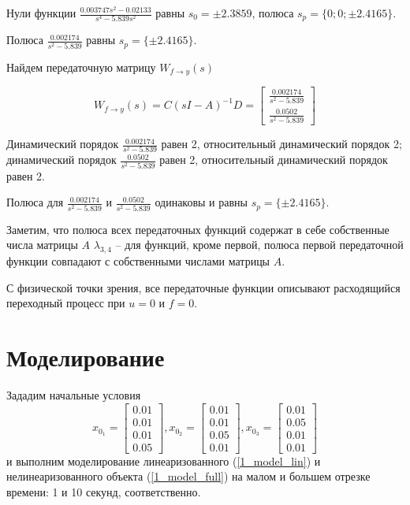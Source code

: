 Нули функции $\frac{0.003747s^2 -0.02133}{s^4-5.839s^2}$ равны $s_0 =\pm 2.3859$, полюса $s_p = \{ 0; 0; \pm 2.4165 \}$.

Полюса $\frac{0.002174}{s^2-5.839}$ равны $s_p = \{ \pm 2.4165 \}$.

Найдем передаточную матрицу $W_{f \to y}(s)$

\begin{equation}
    W_{f \to y} (s) = C \left(sI-A  \right)^{-1}D = \begin{bmatrix}
        \frac{0.002174}{s^2-5.839}\\[2ex]
        \frac{0.0502}{s^2-5.839}
    \end{bmatrix}
\end{equation}

Динамический порядок $ \frac{0.002174}{s^2-5.839}$ равен 2, относительный динамический порядок 2; динамический порядок $\frac{0.0502}{s^2-5.839}$ равен 2, относительный динамический порядок равен 2.

Полюса для  $ \frac{0.002174}{s^2-5.839}$ и $\frac{0.0502}{s^2-5.839}$ одинаковы и равны $s_p = \{ \pm 2.4165 \}$.

Заметим, что полюса всех передаточных функций содержат в себе собственные числа матрицы $A$ $\lambda_{3,4}$ -- для функций, кроме первой, полюса первой передаточной функции совпадают с собственными числами матрицы $A$.

С физической точки зрения, все передаточные функции описывают расходящийся переходный процесс при $u=0$ и $f=0$.


\section{Моделирование}

Зададим начальные условия $$x_{0_1} = \begin{bmatrix}
     0.01\\
    0.01\\
    0.01\\
    0.05
\end{bmatrix},  x_{0_2} = \begin{bmatrix}
    0.01\\
    0.01\\
    0.05\\
    0.01
\end{bmatrix},  x_{0_3} = \begin{bmatrix}
    0.01\\
    0.05\\
    0.01\\
    0.01
\end{bmatrix}$$
и выполним моделирование линеаризованного (\ref{1_model_lin}) и нелинеаризованного объекта (\ref{1_model_full}) на малом и большем отрезке времени: 1 и 10 секунд, соответственно.


